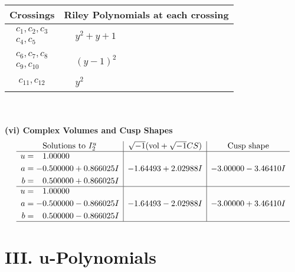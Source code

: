 \documentclass[1p]{elsarticle_modified}
\theoremstyle{definition}
\newcommand{\I}{\sqrt{-1}}
\begin{document}
\begin{tabular}{m{50pt}|m{274pt}}
Crossings & \hspace{64pt}Riley Polynomials at each crossing \\
\hline $$\begin{aligned}c_{1},c_{2},c_{3}\\c_{4},c_{5}\end{aligned}$$&$\begin{aligned}
&y^2+y+1
\end{aligned}$\\
\hline $$\begin{aligned}c_{6},c_{7},c_{8}\\c_{9},c_{10}\end{aligned}$$&$\begin{aligned}
&(y-1)^2
\end{aligned}$\\
\hline $$\begin{aligned}c_{11},c_{12}\end{aligned}$$&$\begin{aligned}
&y^2
\end{aligned}$\\
\hline
\end{tabular}\\~\\
\newpage\flushleft \textbf{(vi) Complex Volumes and Cusp Shapes}
$$\begin{array}{c|c|c}  
\text{Solutions to }I^u_{2}& \I (\text{vol} + \sqrt{-1}CS) & \text{Cusp shape}\\
 \hline 
\begin{aligned}
u &= \phantom{-}1.00000\phantom{ +0.000000I} \\
a &= -0.500000 + 0.866025 I \\
b &= \phantom{-}0.500000 + 0.866025 I\end{aligned}
 & -1.64493 + 2.02988 I & -3.00000 - 3.46410 I \\ \hline\begin{aligned}
u &= \phantom{-}1.00000\phantom{ +0.000000I} \\
a &= -0.500000 - 0.866025 I \\
b &= \phantom{-}0.500000 - 0.866025 I\end{aligned}
 & -1.64493 - 2.02988 I & -3.00000 + 3.46410 I\\
 \hline 
 \end{array}$$\newpage
\newpage\renewcommand{\arraystretch}{1}
\centering \section*{ III. u-Polynomials}
\end{document}
